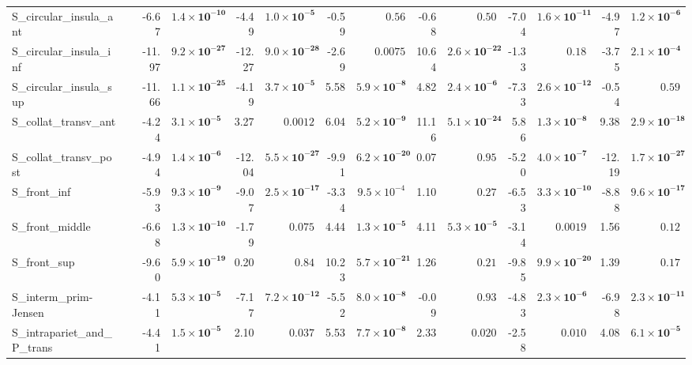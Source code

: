 {\begin{longtable}{llrrrrrrrrrrrr}
S\_circular\_insula\_ant &  & -6.67 & $\mathbf{1.4{\times}10^{-10}}$ & -4.49 & $\mathbf{1.0{\times}10^{-5}}$ & -0.59 & $0.56$ & -0.68 & $0.50$ & -7.04 & $\mathbf{1.6{\times}10^{-11}}$ & -4.97 & $\mathbf{1.2{\times}10^{-6}}$ \\
S\_circular\_insula\_inf &  & -11.97 & $\mathbf{9.2{\times}10^{-27}}$ & -12.27 & $\mathbf{9.0{\times}10^{-28}}$ & -2.69 & $0.0075$ & 10.64 & $\mathbf{2.6{\times}10^{-22}}$ & -1.33 & $0.18$ & -3.75 & $\mathbf{2.1{\times}10^{-4}}$ \\
S\_circular\_insula\_sup &  & -11.66 & $\mathbf{1.1{\times}10^{-25}}$ & -4.19 & $\mathbf{3.7{\times}10^{-5}}$ & 5.58 & $\mathbf{5.9{\times}10^{-8}}$ & 4.82 & $\mathbf{2.4{\times}10^{-6}}$ & -7.33 & $\mathbf{2.6{\times}10^{-12}}$ & -0.54 & $0.59$ \\
S\_collat\_transv\_ant &  & -4.24 & $\mathbf{3.1{\times}10^{-5}}$ & 3.27 & $0.0012$ & 6.04 & $\mathbf{5.2{\times}10^{-9}}$ & 11.16 & $\mathbf{5.1{\times}10^{-24}}$ & 5.86 & $\mathbf{1.3{\times}10^{-8}}$ & 9.38 & $\mathbf{2.9{\times}10^{-18}}$ \\
S\_collat\_transv\_post &  & -4.94 & $\mathbf{1.4{\times}10^{-6}}$ & -12.04 & $\mathbf{5.5{\times}10^{-27}}$ & -9.91 & $\mathbf{6.2{\times}10^{-20}}$ & 0.07 & $0.95$ & -5.20 & $\mathbf{4.0{\times}10^{-7}}$ & -12.19 & $\mathbf{1.7{\times}10^{-27}}$ \\
S\_front\_inf &  & -5.93 & $\mathbf{9.3{\times}10^{-9}}$ & -9.07 & $\mathbf{2.5{\times}10^{-17}}$ & -3.34 & $9.5{\times}10^{-4}$ & 1.10 & $0.27$ & -6.53 & $\mathbf{3.3{\times}10^{-10}}$ & -8.88 & $\mathbf{9.6{\times}10^{-17}}$ \\
S\_front\_middle &  & -6.68 & $\mathbf{1.3{\times}10^{-10}}$ & -1.79 & $0.075$ & 4.44 & $\mathbf{1.3{\times}10^{-5}}$ & 4.11 & $\mathbf{5.3{\times}10^{-5}}$ & -3.14 & $0.0019$ & 1.56 & $0.12$ \\
S\_front\_sup &  & -9.60 & $\mathbf{5.9{\times}10^{-19}}$ & 0.20 & $0.84$ & 10.23 & $\mathbf{5.7{\times}10^{-21}}$ & 1.26 & $0.21$ & -9.85 & $\mathbf{9.9{\times}10^{-20}}$ & 1.39 & $0.17$ \\
S\_interm\_prim-Jensen &  & -4.11 & $\mathbf{5.3{\times}10^{-5}}$ & -7.17 & $\mathbf{7.2{\times}10^{-12}}$ & -5.52 & $\mathbf{8.0{\times}10^{-8}}$ & -0.09 & $0.93$ & -4.83 & $\mathbf{2.3{\times}10^{-6}}$ & -6.98 & $\mathbf{2.3{\times}10^{-11}}$ \\
S\_intrapariet\_and\_P\_trans &  & -4.41 & $\mathbf{1.5{\times}10^{-5}}$ & 2.10 & $0.037$ & 5.53 & $\mathbf{7.7{\times}10^{-8}}$ & 2.33 & $0.020$ & -2.58 & $0.010$ & 4.08 & $\mathbf{6.1{\times}10^{-5}}$ \\

\end{longtable}}
